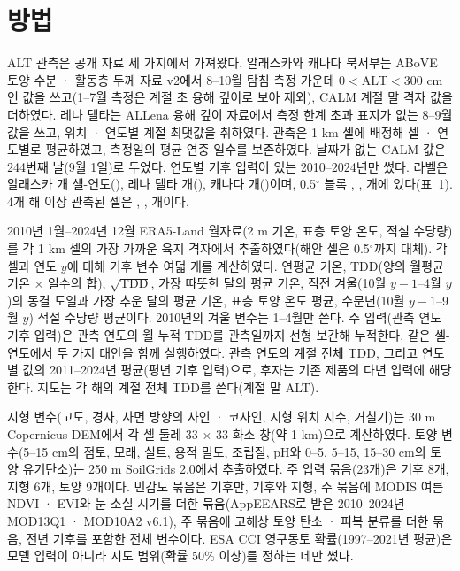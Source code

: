 \section{방법}\label{sec:methods}

ALT 관측은 공개 자료 세 가지에서 가져왔다. 알래스카와 캐나다 북서부는 ABoVE 토양 수분 · 활동층 두께 자료 v2\cite{Moore2025}에서 8--10월 탐침 측정 가운데 $0<\mathrm{ALT}<300$ cm인 값을 쓰고(1--7월 측정은 계절 초 융해 깊이로 보아 제외), CALM 계절 말 격자 값\cite{Streletskiy2025}을 더하였다. 레나 델타는 ALLena 융해 깊이 자료\cite{Veremeeva2025}에서 측정 한계 초과 표지가 없는 8--9월 값을 쓰고, 위치 · 연도별 계절 최댓값을 취하였다. 관측은 1 km 셀에 배정해 셀 · 연도별로 평균하였고, 측정일의 평균 연중 일수를 보존하였다. 날짜가 없는 CALM 값은 244번째 날(9월 1일)로 두었다. 연도별 기후 입력이 있는 2010--2024년만 썼다. 라벨은 알래스카 \nncyAk{}개 셀-연도(\nyrsAkko), 레나 델타 \nncyLe{}개(\nyrsLeko), 캐나다 \nncyCa{}개(\nyrsCako)이며, 0.5$^\circ$ 블록 \nnblkAk, \nnblkLe, \nnblkCa{}개에 있다(표~1). 4개 해 이상 관측된 셀은 \nnmultiAk, \nnmultiLe, \nnmultiCa{}개이다.

2010년 1월--2024년 12월 ERA5-Land 월자료\cite{munozsabater2021_era5_land}(2 m 기온, 표층 토양 온도, 적설 수당량)를 각 1 km 셀의 가장 가까운 육지 격자에서 추출하였다(해안 셀은 0.5$^\circ$까지 대체). 각 셀과 연도 $y$에 대해 기후 변수 여덟 개를 계산하였다. 연평균 기온, TDD(양의 월평균 기온 × 일수의 합), $\sqrt{\mathrm{TDD}}$, 가장 따뜻한 달의 평균 기온, 직전 겨울(10월 $y-1$--4월 $y$)의 동결 도일과 가장 추운 달의 평균 기온, 표층 토양 온도 평균, 수문년(10월 $y-1$--9월 $y$) 적설 수당량 평균이다. 2010년의 겨울 변수는 1--4월만 쓴다. 주 입력(관측 연도 기후 입력)은 관측 연도의 월 누적 TDD를 관측일까지 선형 보간해 누적한다. 같은 셀-연도에서 두 가지 대안을 함께 실행하였다. 관측 연도의 계절 전체 TDD, 그리고 연도별 값의 2011--2024년 평균(평년 기후 입력)으로, 후자는 기존 제품의 다년 입력에 해당한다. 지도는 각 해의 계절 전체 TDD를 쓴다(계절 말 ALT).

지형 변수(고도, 경사, 사면 방향의 사인 · 코사인, 지형 위치 지수, 거칠기)는 30 m Copernicus DEM\cite{CopDEM2021}에서 각 셀 둘레 33 × 33 화소 창(약 1 km)으로 계산하였다. 토양 변수(5--15 cm의 점토, 모래, 실트, 용적 밀도, 조립질, pH와 0--5, 5--15, 15--30 cm의 토양 유기탄소)는 250 m SoilGrids 2.0\cite{Poggio2021}에서 추출하였다. 주 입력 묶음(23개)은 기후 8개, 지형 6개, 토양 9개이다. 민감도 묶음은 기후만, 기후와 지형, 주 묶음에 MODIS 여름 NDVI · EVI와 눈 소실 시기를 더한 묶음(AppEEARS로 받은 2010--2024년 MOD13Q1 · MOD10A2 v6.1\cite{Didan2021,HallRiggs2021}), 주 묶음에 고해상 토양 탄소 · 피복 분류를 더한 묶음\cite{Palmtag2022}, 전년 기후를 포함한 전체 변수이다. ESA CCI 영구동토 확률(1997--2021년 평균)\cite{Westermann2024}은 모델 입력이 아니라 지도 범위(확률 50\% 이상)를 정하는 데만 썼다.

